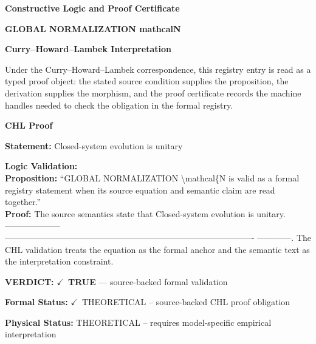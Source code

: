 \clearpage
\begingroup\tzpsupportsetup
\noindent\textbf{\fontsize{10.8pt}{12.8pt}\selectfont [ID 0562] Constructive Logic and Proof Certificate}\par
\noindent\textbf{\fontsize{10pt}{12pt}\selectfont GLOBAL NORMALIZATION mathcalN}\par
\vspace{0.45em}
\begingroup
\footnotesize
\setlength{\parskip}{0.22em}
\setlength{\parindent}{0pt}
\noindent\textbf{Curry--Howard--Lambek Interpretation}\par
Under the Curry--Howard--Lambek correspondence, this registry entry is read as a typed proof
object: the stated source condition supplies the proposition, the derivation supplies the
morphism, and the proof certificate records the machine handles needed to check the obligation
in the formal registry.

\vspace{0.45em}
\noindent\textbf{CHL Proof}\par
\textbf{Statement:} Closed-system evolution is unitary

\textbf{Logic Validation:}\\
\textbf{Proposition:} ``GLOBAL NORMALIZATION \textbackslash{}mathcal\{N is valid as a formal registry statement when its source
equation and semantic claim are read together.''\\
\textbf{Proof:} The source semantics state that Closed-system evolution is unitary. --------------------
----------------------------------------------------------------------------------------
------------. The CHL validation treats the equation as the formal anchor and the
semantic text as the interpretation constraint.

\textbf{VERDICT:} \ensuremath{\checkmark}\ \textbf{TRUE} --- source-backed formal validation

\textbf{Formal Status:} \ensuremath{\checkmark}\ THEORETICAL -- source-backed CHL proof obligation

\textbf{Physical Status:} THEORETICAL -- requires model-specific empirical interpretation
\par\vspace{0.45em}
\par
\ifTZPDarkEdition
{}
\fi
\endgroup
\endgroup
